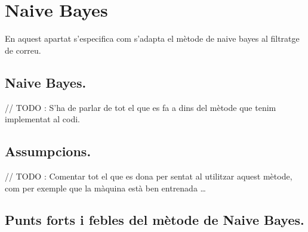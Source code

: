 \documentclass[]{article}
\newenvironment{Shaded}{\begin{snugshade}}{\end{snugshade}}
\newcommand{\CommentTok}[1]{\textcolor[rgb]{0.56,0.35,0.01}{\textit{#1}}}
\newcommand{\KeywordTok}[1]{\textcolor[rgb]{0.13,0.29,0.53}{\textbf{#1}}}
\newcommand{\NormalTok}[1]{#1}
\newcommand{\OperatorTok}[1]{\textcolor[rgb]{0.81,0.36,0.00}{\textbf{#1}}}
\newcommand{\StringTok}[1]{\textcolor[rgb]{0.31,0.60,0.02}{#1}}
\begin{document}
\begin{Shaded}
\end{Shaded}

\hypertarget{naive-bayes}{%
\section{Naive Bayes}\label{naive-bayes}}

En aquest apartat s'especifica com s'adapta el mètode de naive bayes al
filtratge de correu.

\hypertarget{naive-bayes.}{%
\subsection{Naive Bayes.}\label{naive-bayes.}}

// TODO : S'ha de parlar de tot el que es fa a dins del mètode que tenim
implementat al codi.

\hypertarget{assumpcions.}{%
\subsection{Assumpcions.}\label{assumpcions.}}

// TODO : Comentar tot el que es dona per sentat al utilitzar aquest
mètode, com per exemple que la màquina està ben entrenada \ldots{}

\hypertarget{punts-forts-i-febles-del-metode-de-naive-bayes.}{%
\subsection{Punts forts i febles del mètode de Naive
Bayes.}\label{punts-forts-i-febles-del-metode-de-naive-bayes.}}
\end{document}

